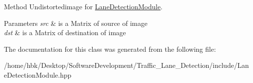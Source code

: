 Method Undistortedimage for \hyperlink{classLaneDetectionModule}{Lane\+Detection\+Module}. 


\begin{DoxyParams}{Parameters}
{\em src} & is a Matrix of source of image \\
\hline
{\em dst} & is a Matrix of destination of image \\
\hline
\end{DoxyParams}


The documentation for this class was generated from the following file\+:\begin{DoxyCompactItemize}
\item 
/home/hbk/\+Desktop/\+Software\+Development/\+Traffic\+\_\+\+Lane\+\_\+\+Detection/include/Lane\+Detection\+Module.\+hpp\end{DoxyCompactItemize}
